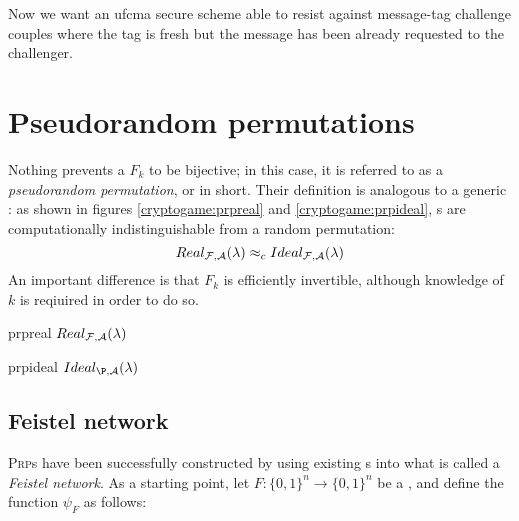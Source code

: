 Now we want an ufcma secure scheme able to resist against message-tag challenge couples where the tag is fresh but the message has been already requested to the challenger.

\section{Pseudorandom permutations}


Nothing prevents a \prf{} $F_k$ to be bijective; in this case, it is referred to as a \emph{pseudorandom permutation}, or \prp{} in short. Their definition is analogous to a generic \prf: as shown in figures \ref{cryptogame:prpreal} and \ref{cryptogame:prpideal}, \prp{}s are computationally indistinguishable from a random permutation:
\[
    Real_{\mathcal{F}, \mathcal{A}}(\lambda) \approx_{c} Ideal_{\mathcal{F}, \mathcal{A}}(\lambda)
\]
An important difference is that $F_k$ is efficiently invertible, although knowledge of $k$ is reqiuired in order to do so.

\begin{cryptogame}
    {prpreal}
    {$Real_{\mathcal{F}, \mathcal{A}}(\lambda)$}
    {}


    \cseqbeginloop
    \cseqendloop

    
\end{cryptogame}

\begin{cryptogame}
    {prpideal}
    {$Ideal_{\P, \A}(\lambda)$}
    {}


    \cseqbeginloop
    \cseqendloop

    
\end{cryptogame}

\subsection{Feistel network}

\textsc{Prp}s have been successfully constructed by using existing \prf{}s into what is called a \emph{Feistel network}. As a starting point, let $F : \{0, 1\}^n \to \{0, 1\}^n$ be a \prf, and define the function $\psi_F$ as follows:

